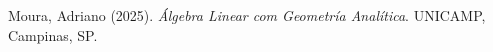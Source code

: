 \documentclass[a4paper, 17pt]{extarticle}
\begin{document}
 
 


\begin{thebibliography}{9}


Moura, Adriano (2025). \textit{Álgebra Linear com Geometría Analítica}. UNICAMP, Campinas, SP. 

\end{thebibliography}


\end{document}
